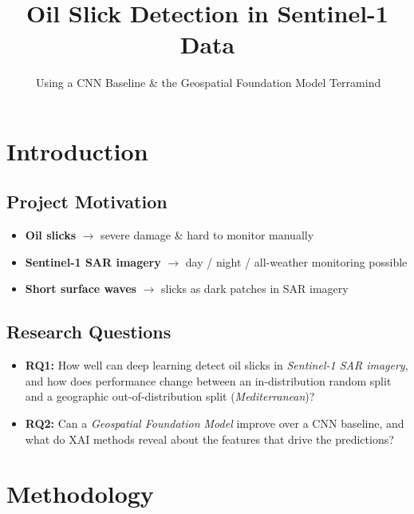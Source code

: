\documentclass[a0, landscape, final]{./unirostock/a0poster}
\title{Oil Slick Detection in Sentinel-1 Data}
\subtitle{\,Using a CNN Baseline \& the Geospatial Foundation Model Terramind}
\begin{document}
 


\nocite{11445875}

\linespread{1.15}

\section{Introduction} \vspace{-1em}
\subsection{Project Motivation} \vspace{-1.5em}

\begin{itemize}
  \item \textbf{Oil slicks} $\to$ severe damage \& hard to monitor manually
  \item \textbf{Sentinel-1 SAR imagery} $\to$ day / night / all-weather monitoring possible
  \item \textbf{Short surface waves} $\to$ slicks as dark patches in SAR imagery
\end{itemize}
\vspace{.5em}
\subsection{Research Questions} \vspace{-1.5em}
\begin{itemize}
  \item \textbf{RQ1:} How well can deep learning detect oil slicks in \textit{Sentinel-1 SAR imagery}, and how does performance change between an in-distribution random split and a geographic out-of-distribution split (\textit{Mediterranean})?
  \item \textbf{RQ2:} Can a \textit{Geospatial Foundation Model} improve over a CNN baseline, and what do XAI methods reveal about the features that drive the predictions?
\end{itemize}

\section{Methodology} \vspace{.5em}
\end{document}
